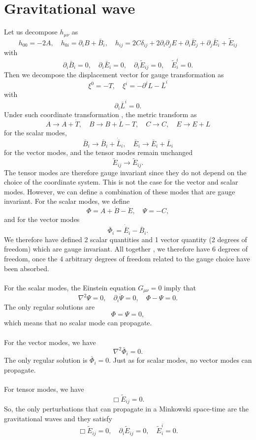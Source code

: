 \documentclass[cyan]{elegantnote}
\begin{document}
\section{Gravitational wave}
Let us decompose $h_{\mu\nu}$ as
\[h_{00} = -2A , \quad h_{0i} = \partial_i B + \bar{B}_i , \quad h_{ij} = 2C\delta_{ij} + 2\partial_i\partial_j E + \partial _i\bar{E}_j + \partial_j\bar{E}_i + \tilde{E}_{ij} \]
with
\[\partial_i \bar{B}_i = 0 , \quad \partial_i \bar{E}_i = 0 , \quad \partial_i \tilde{E}_{ij} = 0 , \quad \tilde{E}^i_i = 0.\]
Then we decompose the displacement vector for gauge transformation as
\[\xi^0 = -T , \quad \xi^i = -\partial^i L - \bar{L}^i \]
with
\[\partial_i \bar{L}^i = 0.\]
Under such coordinate transformation , the metric transform as
\[A \to A + \dot{T} , \quad B \to B + \dot{L} - T , \quad C \to C , \quad E \to E  + L \]
for the scalar modes,
\[\bar{B}_i \to \bar{B}_i + \dot{\bar{L}}_i , \quad \bar{E}_i \to \bar{E}_i + \bar{L}_i \]
for the vector modes, and the tensor modes remain unchanged
\[\tilde{E}_{ij} \to \tilde{E}_{ij}.\]
The tensor modes are therefore gauge invariant since they do not depend on the choice of the coordinate system. This is not the case for the vector and scalar modes. However, we can define a combination of these modes that are gauge invariant. For the scalar modes, we define
\[\Phi = A + \dot{B} - \ddot{E} , \quad \Psi = -C, \]
and for the vector modes
\[\bar{\Phi}_i = \dot{\bar{E}}_i - \bar{B}_i.\]
We therefore have defined 2 scalar quantities and 1 vector quantity (2 degrees of freedom) which are gauge invariant. All together , we therefore have $6$ degrees of freedom, once the $4$ arbitrary degrees of freedom related to the gauge choice have been absorbed.
\\ \\
For the scalar modes, the Einstein equation $G_{\mu\nu} = 0$ imply that
\[\nabla^2 \Psi = 0 , \quad \partial_i \dot{\Psi} =0 , \quad \Phi-\Psi = 0.\]
The only regular solutions are
\[\Phi = \Psi = 0,\]
which means that no scalar mode can propagate.
\\ \\
For the vector modes, we have
\[\nabla^2 \bar{\Phi}_i = 0.\]
The only regular solution is $\bar{\Phi}_i = 0$. Just as for scalar modes, no vector modes can propagate.
\\ \\
For tensor modes, we have
\[\Box \tilde{E}_{ij} = 0.\]
So, the only perturbations that can propagate in a Minkowski space-time are the gravitational waves and they satisfy
\[\Box \tilde{E}_{ij} = 0 , \quad \partial_i \tilde{E}_{ij} = 0 , \quad \tilde{E}^i_i = 0.\]
\end{document}
